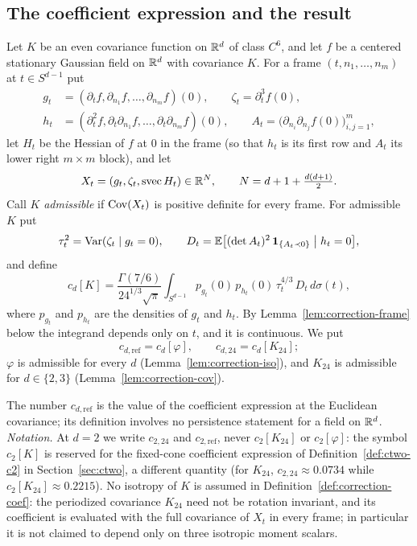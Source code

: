 \subsection{The coefficient expression and the result}

\begin{definition}\label{def:correction-coef}
Let $K$ be an even covariance function on $\mathbb R^d$ of class $C^6$, and let $f$ be a centered stationary Gaussian field on $\mathbb R^d$ with covariance $K$. For a frame $(t,n_1,\dots,n_m)$ at $t\in S^{d-1}$ put
\begin{equation}\label{eq:correction-jetvars}
\begin{aligned}
g_t&=(\partial_tf,\partial_{n_1}f,\dots,\partial_{n_m}f)(0),\qquad \zeta_t=\partial_t^3f(0),\\
h_t&=(\partial_t^2f,\partial_t\partial_{n_1}f,\dots,\partial_t\partial_{n_m}f)(0),\qquad A_t=\bigl(\partial_{n_i}\partial_{n_j}f(0)\bigr)_{i,j=1}^m ,
\end{aligned}
\end{equation}
let $H_t$ be the Hessian of $f$ at $0$ in the frame (so that $h_t$ is its first row and $A_t$ its lower right $m\times m$ block), and let
\[
X_t=(g_t,\zeta_t,\operatorname{svec}H_t)\in\mathbb R^N,\qquad N=d+1+\tfrac{d(d+1)}2 .
\]
Call $K$ \emph{admissible} if $\operatorname{Cov}(X_t)$ is positive definite for every frame. For admissible $K$ put
\begin{equation}\label{eq:correction-tauD}
\tau_t^2=\operatorname{Var}(\zeta_t\mid g_t=0),\qquad D_t=\mathbb E\bigl[(\det A_t)^2\,\mathbf 1_{\{A_t\prec0\}}\bigm| h_t=0\bigr],
\end{equation}
and define
\begin{equation}\label{eq:correction-coef}
c_d[K]=\frac{\Gamma(7/6)}{24^{1/3}\sqrt\pi}\int_{S^{d-1}}p_{g_t}(0)\,p_{h_t}(0)\,\tau_t^{4/3}\,D_t\,d\sigma(t),
\end{equation}
where $p_{g_t}$ and $p_{h_t}$ are the densities of $g_t$ and $h_t$. By Lemma~\ref{lem:correction-frame} below the integrand depends only on $t$, and it is continuous. We put
\[
c_{d,\mathrm{ref}}=c_d[\varphi],\qquad c_{d,24}=c_d[K_{24}];
\]
$\varphi$ is admissible for every $d$ (Lemma~\ref{lem:correction-iso}), and $K_{24}$ is admissible for $d\in\{2,3\}$ (Lemma~\ref{lem:correction-cov}).
\end{definition}

The number $c_{d,\mathrm{ref}}$ is the value of the coefficient expression at the Euclidean covariance; its definition involves no persistence statement for a field on $\mathbb R^d$. \emph{Notation.} At $d=2$ we write $c_{2,24}$ and $c_{2,\mathrm{ref}}$, never $c_2[K_{24}]$ or $c_2[\varphi]$: the symbol $c_2[K]$ is reserved for the fixed-cone coefficient expression of Definition~\ref{def:ctwo-c2} in Section~\ref{sec:ctwo}, a different quantity (for $K_{24}$, $c_{2,24}\approx0.0734$ while $c_2[K_{24}]\approx0.2215$). No isotropy of $K$ is assumed in Definition~\ref{def:correction-coef}: the periodized covariance $K_{24}$ need not be rotation invariant, and its coefficient is evaluated with the full covariance of $X_t$ in every frame; in particular it is not claimed to depend only on three isotropic moment scalars.


